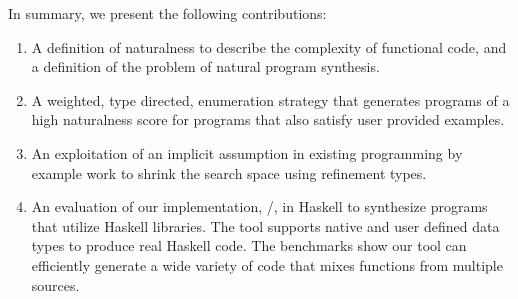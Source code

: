 In summary, we present the following contributions:

\begin{enumerate}
\item A definition of naturalness to describe the complexity of functional code, and a definition of the problem of natural program synthesis.
\item A weighted, type directed, enumeration strategy that generates programs of a high naturalness score for programs that also satisfy user provided examples. 
\item An exploitation of an implicit assumption in existing programming by example work to shrink the search space using refinement types.
\item An evaluation of our implementation, \ourTool/, in Haskell to synthesize programs that utilize Haskell libraries. The tool supports native and user defined data types to produce real Haskell code. The benchmarks show our tool can efficiently generate a wide variety of code that mixes functions from multiple sources.
\end{enumerate}
